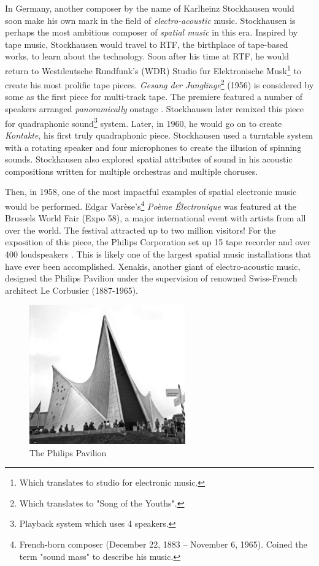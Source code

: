 In Germany, another composer by the name of Karlheinz Stockhausen would soon make his own mark in the field of \textit{electro-acoustic} music. Stockhausen is perhaps the most ambitious composer of \textit{spatial music} in this era. Inspired by tape music, Stockhausen would travel to RTF, the birthplace of tape-based works, to learn about the technology. Soon after his time at RTF, he would return to Westdeutsche Rundfunk's (WDR) Studio fur Elektronische Musk\footnote{Which translates to studio for electronic music.} to create his most prolific tape pieces. \textit{Gesang der Junglinge}\footnote{Which translates to "Song of the Youths".} (1956) is considered by some as the first piece for multi-track tape. The premiere featured a number of speakers arranged \textit{panoramically} onstage \cite{zvonar1999history}. Stockhausen later remixed this piece for quadraphonic sound\footnote{Playback system which uses 4 speakers.} system. Later, in 1960, he would go on to create \textit{Kontakte}, his first truly quadraphonic piece. Stockhausen used a turntable system with a rotating speaker and four microphones to create the illusion of spinning sounds. Stockhausen also explored spatial attributes of sound in his acoustic compositions written for multiple orchestras and multiple choruses.


Then, in 1958, one of the most impactful examples of spatial electronic music would be performed. Edgar Varèse's\footnote{French-born composer (December 22, 1883 – November 6, 1965). Coined the term "sound mass" to describe his music. } \textit{Poème Électronique} was featured at the Brussels World Fair (Expo 58), a major international event with artists from all over the world. The festival attracted up to two million visitors! For the exposition of this piece, the Philips Corporation set up 15 tape recorder and over 400 loudspeakers \cite{malham19953}. This is likely one of the largest spatial music installations that have ever been accomplished. Xenakis, another giant of electro-acoustic music, designed the Philips Pavilion under the supervision of renowned Swiss-French architect Le Corbusier (1887-1965). 

\begin{figure}[ht!]%
\centering
\includegraphics[width=0.6\textwidth]{img/expo58.jpg} 
\caption{The Philips Pavilion \cite{wikipedia_2020_expo}}
\end{figure}

